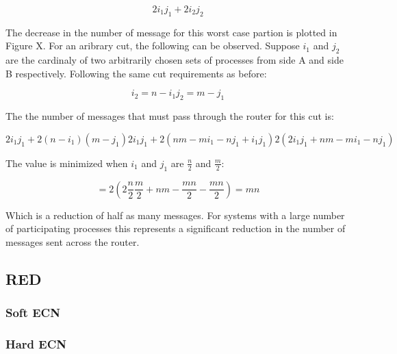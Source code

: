 \begin{equation}
2 i_{1} j_{1} + 2 i_{2} j_{2}
\end{equation}

The decrease in the number of message for this worst case partion is plotted in Figure X.
For an aribrary cut, the following can be observed.
Suppose $i_{1}$ and $j_{2}$ are the cardinaly of two arbitrarily chosen sets of processes from side A and side B respectively.
Following the same cut requirements as before:

\begin{equation}
i_2 = n - i_1
j_2 = m - j_1
\end{equation}

The the number of messages that must pass through the router for this cut is:

\begin{equation}
2 i_{1} j_{1} + 2 (n-i_{1}) (m-j_{1})
2 i_{1} j_{1} + 2 (nm - mi_{1} - nj_{1} + i_{1}j_{1})
2 (2 i_{1} j_{1} + nm - mi_{1} - nj_{1})
\end{equation}

The value is minimized when $i_1$ and $j_1$ are $\frac{n}{2}$ and $\frac{m}{2}$:

\begin{equation}
= 2( 2 \frac{n}{2} \frac{m}{2} + nm - \frac{mn}{2} - \frac{mn}{2})
= mn
\end{equation}

Which is a reduction of half as many messages.
For systems with a large number of participating processes this represents a significant reduction in the number of messages sent across the router.

\subsection{RED}
\subsubsection{Soft ECN}
\subsubsection{Hard ECN}

